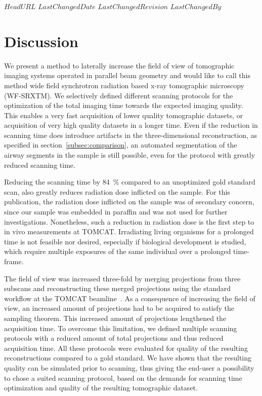 \svnidlong
{$HeadURL$}
{$LastChangedDate$}
{$LastChangedRevision$}
{$LastChangedBy$}
%
\section{Discussion}
\label{sec:Discussion}
We present a method to laterally increase the field of view of tomographic imaging systems operated in parallel beam geometry and would like to call this method wide field synchrotron radiation based x-ray tomographic microscopy (WF-SRXTM). We selectively defined different scanning protocols for the optimization of the total imaging time towards the expected imaging quality. This enables a very fast acquisition of lower quality tomographic datasets, or acquisition of very high quality datasets in a longer time. Even if the reduction in scanning time does introduce artifacts in the three-dimensional reconstruction, as specified in section~\ref{subsec:comparison}, an automated segmentation of the airway segments in the sample is still possible, even for the protocol with greatly reduced scanning time.

Reducing the scanning time by \SI{84}{\percent} compared to an unoptimized gold standard scan, also greatly reduces radiation dose inflicted on the sample. For this publication, the radiation dose inflicted on the sample was of secondary concern, since our sample was embedded in paraffin and was not used for further investigations. Nonetheless, such a reduction in radiation dose is the first step to in vivo measurements at TOMCAT. Irradiating living organisms for a prolonged time is not feasible nor desired, especially if biological development is studied, which require multiple exposures of the same individual over a prolonged time-frame.

The field of view was increased three-fold by merging projections from three subscans and reconstructing these merged projections using the standard workflow at the TOMCAT beamline~\cite{Hintermueller2009}. As a consequence of increasing the field of view, an increased amount of projections had to be acquired to satisfy the sampling theorem. This increased amount of projections lengthened the acquisition time. To overcome this limitation, we defined multiple scanning protocols with a reduced amount of total projections and thus reduced acquisition time. All these protocols were evaluated for quality of the resulting reconstructions compared to a gold standard. We have shown that the resulting quality can be simulated prior to scanning, thus giving the end-user a possibility to chose a suited scanning protocol, based on the demands for scanning time optimization and quality of the resulting tomographic dataset.

